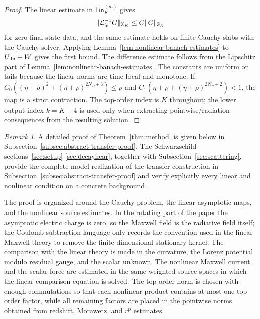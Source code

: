\documentclass[11pt]{article}
\numberwithin{equation}{section}
\theoremstyle{plain}
\theoremstyle{definition}
\theoremstyle{remark}
\newtheorem{remark}{Remark}[section]
\newcommand{\Lin}{\mathsf{Lin}}
\begin{document}
\begin{proof}
The linear estimate in \(\Lin_K^{(m)}\) gives
\begin{equation}
\|\mathcal L^{-1}_{\rm fs}G\|_{\mathbb X_K}\le C\|G\|_{\mathbb S_K}
\end{equation}
for zero final-state data, and the same estimate holds on finite Cauchy slabs with the Cauchy solver. Applying Lemma~\ref{lem:nonlinear-banach-estimates} to $U_{\rm lin}+W$ gives the first bound. The difference estimate follows from the Lipschitz part of Lemma~\ref{lem:nonlinear-banach-estimates}. The constants are uniform on tails because the linear norms are time-local and monotone. If $C_0((\eta+\rho)^2+(\eta+\rho)^{2N_P+3})\le \rho$ and $C_1(\eta+\rho+(\eta+\rho)^{2N_P+2})<1$, the map is a strict contraction. The top-order index is $K$ throughout; the lower output index $k=K-4$ is used only when extracting pointwise/radiation consequences from the resulting solution.
\end{proof}

\begin{remark}\label{rem:method-proof}
A detailed proof of Theorem~\ref{thm:method} is given below in Subsection~\ref{subsec:abstract-transfer-proof}. The Schwarzschild sections~\ref{sec:setup}-\ref{sec:decaynear}, together with Subsection~\ref{sec:scattering}, provide the complete model realization of the transfer construction in Subsection~\ref{subsec:abstract-transfer-proof} and verify explicitly every linear and nonlinear condition on a concrete background.
\end{remark}



The proof is organized around the Cauchy problem, the linear asymptotic maps, and the nonlinear source estimates.  In the rotating part of the paper the asymptotic electric charge is zero, so the Maxwell field is the radiative field itself; the Coulomb-subtraction language only records the convention used in the linear Maxwell theory to remove the finite-dimensional stationary kernel.  The comparison with the linear theory is made in the curvature, the Lorenz potential modulo residual gauge, and the scalar unknown.  The nonlinear Maxwell current and the scalar force are estimated in the same weighted source spaces in which the linear comparison equation is solved.  The top-order norm is chosen with enough commutations so that each nonlinear product contains at most one top-order factor, while all remaining factors are placed in the pointwise norms obtained from redshift, Morawetz, and \(r^p\) estimates.
\end{document}
